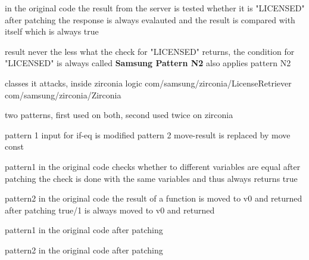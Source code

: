 

in the original code the result from the server is tested whether it is "LICENSED"
after patching the response is always evalauted and the result is compared with itself which is always true

result
never the less what the check for "LICENSED" returns, the condition for "LICENSED" is always called
\newline
\newline
\textbf{Samsung Pattern N2}\newline
also applies pattern N2

classes it attacks, inside zirconia logic
com/samsung/zirconia/LicenseRetriever
com/samsung/zirconia/Zirconia

two patterns, first used on both, second used twice on zirconia



pattern 1
input for if-eq is modified
pattern 2
move-result is replaced by move const


pattern1
in the original code checks whether to different variables are equal
after patching the check is done with the same variables and thus always returns true

pattern2
in the original code the result of a function is moved to v0 and returned
after patching true/1 is always moved to v0 and returned



pattern1
in the original code
after patching

pattern2
in the original code
after patching

